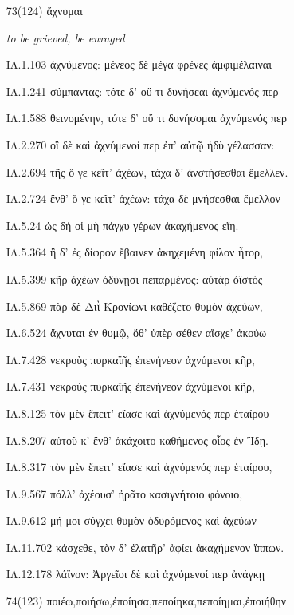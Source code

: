\begin{enumerate}
{ΙΛ.17.32 πρίν τι κακὸν παθέειν: ῥεχθὲν δέ τε νήπιος ἔγνω. 

}

\clearpage
\item[\large 73(124) ]{\large \g ἄχνυμαι}

\hspace{0.2cm} \textit{to be grieved, be enraged  }

{\g
ΙΛ.1.103 ἀχνύμενος: μένεος δὲ μέγα φρένες ἀμφιμέλαιναι 

ΙΛ.1.241 σύμπαντας: τότε δ' οὔ τι δυνήσεαι ἀχνύμενός περ 

ΙΛ.1.588 θεινομένην, τότε δ' οὔ τι δυνήσομαι ἀχνύμενός περ 

ΙΛ.2.270 οἳ δὲ καὶ ἀχνύμενοί περ ἐπ' αὐτῷ ἡδὺ γέλασσαν: 

ΙΛ.2.694 τῆς ὅ γε κεῖτ' ἀχέων, τάχα δ' ἀνστήσεσθαι ἔμελλεν. 

ΙΛ.2.724 ἔνθ' ὅ γε κεῖτ' ἀχέων: τάχα δὲ μνήσεσθαι ἔμελλον 

ΙΛ.5.24 ὡς δή οἱ μὴ πάγχυ γέρων ἀκαχήμενος εἴη. 

ΙΛ.5.364 ἣ δ' ἐς δίφρον ἔβαινεν ἀκηχεμένη φίλον ἦτορ, 

ΙΛ.5.399 κῆρ ἀχέων ὀδύνῃσι πεπαρμένος: αὐτὰρ ὀϊστὸς 

ΙΛ.5.869 πὰρ δὲ Διῒ Κρονίωνι καθέζετο θυμὸν ἀχεύων, 

ΙΛ.6.524 ἄχνυται ἐν θυμῷ, ὅθ' ὑπὲρ σέθεν αἴσχε' ἀκούω 

ΙΛ.7.428 νεκροὺς πυρκαϊῆς ἐπενήνεον ἀχνύμενοι κῆρ, 

ΙΛ.7.431 νεκροὺς πυρκαϊῆς ἐπενήνεον ἀχνύμενοι κῆρ, 

ΙΛ.8.125 τὸν μὲν ἔπειτ' εἴασε καὶ ἀχνύμενός περ ἑταίρου 

ΙΛ.8.207 αὐτοῦ κ' ἔνθ' ἀκάχοιτο καθήμενος οἶος ἐν Ἴδῃ. 

ΙΛ.8.317 τὸν μὲν ἔπειτ' εἴασε καὶ ἀχνύμενός περ ἑταίρου, 

ΙΛ.9.567 πόλλ' ἀχέουσ' ἠρᾶτο κασιγνήτοιο φόνοιο, 

ΙΛ.9.612 μή μοι σύγχει θυμὸν ὀδυρόμενος καὶ ἀχεύων 

ΙΛ.11.702 κάσχεθε, τὸν δ' ἐλατῆρ' ἀφίει ἀκαχήμενον ἵππων. 

ΙΛ.12.178 λάϊνον: Ἀργεῖοι δὲ καὶ ἀχνύμενοί περ ἀνάγκῃ 

}

\clearpage
\item[\large 74(123)]{\large \g ποιέω,ποιήσω,ἐποίησα,πεποίηκα,πεποίημαι,ἐποιήθην}


\end{enumerate}
